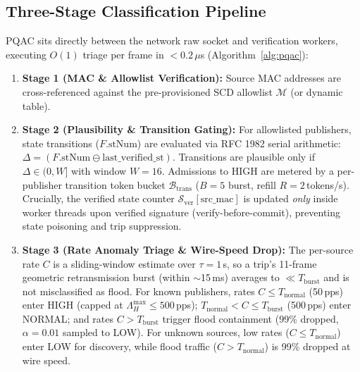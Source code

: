 \documentclass[journal]{IEEEtran}
\begin{document}
\subsection{Three-Stage Classification Pipeline}
PQAC sits directly between the network raw socket and verification workers, executing $O(1)$ triage per frame in $<0.2\,\mu$s (Algorithm~\ref{alg:pqac}):
\begin{enumerate}[leftmargin=*,noitemsep,topsep=1pt]
    \item \textbf{Stage 1 (MAC \& Allowlist Verification):} Source MAC addresses are cross-referenced against the pre-provisioned SCD allowlist $\mathcal{M}$ (or dynamic table).
    \item \textbf{Stage 2 (Plausibility \& Transition Gating):} For allowlisted publishers, state transitions ($F.\text{stNum}$) are evaluated via RFC 1982 serial arithmetic: $\Delta = (F.\text{stNum} \ominus \text{last\_verified\_st})$. Transitions are plausible only if $\Delta \in (0, W]$ with window $W = 16$. Admissions to HIGH are metered by a per-publisher transition token bucket $\mathcal{B}_{\text{trans}}$ ($B = 5$ burst, refill $R = 2$\,tokens/s). Crucially, the verified state counter $\mathcal{S}_{\text{ver}}[\text{src\_mac}]$ is updated \emph{only} inside worker threads upon verified signature (verify-before-commit), preventing state poisoning and trip suppression.
    \item \textbf{Stage 3 (Rate Anomaly Triage \& Wire-Speed Drop):} The per-source rate $C$ is a sliding-window estimate over $\tau=1$\,s, so a trip's 11-frame geometric retransmission burst (within $\sim$15\,ms) averages to $\ll T_{\text{burst}}$ and is not misclassified as flood. For known publishers, rates $C \le T_{\text{normal}}$ (50\,pps) enter HIGH (capped at $\Lambda_H^{\max} \le 500$\,pps); $T_{\text{normal}} < C \le T_{\text{burst}}$ (500\,pps) enter NORMAL; and rates $C > T_{\text{burst}}$ trigger flood containment (99\% dropped, $\alpha = 0.01$ sampled to LOW). For unknown sources, low rates ($C \le T_{\text{normal}}$) enter LOW for discovery, while flood traffic ($C > T_{\text{normal}}$) is 99\% dropped at wire speed.
\end{enumerate}
\end{document}

